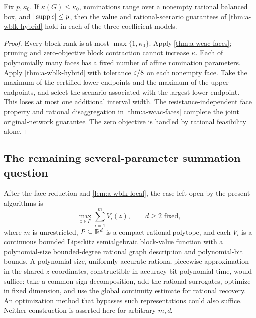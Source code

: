 \begin{corollary}
\label{cor:a-wblk-hybrid-box}
Fix $p,\kappa_0$. If $\kappa(G)\le\kappa_0$, nominations range over a
nonempty rational balanced box, and $|\operatorname{supp} c|\le p$, then the value and
rational-scenario guarantees of \cref{thm:a-wblk-hybrid} hold in each
of the three coefficient models.
\end{corollary}
\begin{proof}
Every block rank is at most $\max\{1,\kappa_0\}$. Apply
\cref{thm:a-wcac-faces}; pruning and zero-objective block contraction
cannot increase $\kappa$. Each of polynomially many faces has a fixed
number of affine nomination parameters. Apply
\cref{thm:a-wblk-hybrid} with tolerance $\varepsilon/8$ on each nonempty face.
Take the maximum of the certified lower endpoints and the maximum of
the upper endpoints, and select the scenario associated with the largest
lower endpoint. This loses at most one additional interval width.
The resistance-independent face property and rational disaggregation
in \cref{thm:a-wcac-faces} complete the joint original-network guarantee.
The zero objective is handled by rational feasibility alone.
\end{proof}

\subsection{The remaining several-parameter summation question}

After the face reduction and \cref{lem:a-wblk-local}, the case left
open by the present algorithms is
\begin{equation}
 \max_{z\in P}\sum_{i=1}^m V_i(z),\qquad d\ge2\text{ fixed},
 \label{eq:a-wblk-residual}
\end{equation}
where $m$ is unrestricted, $P\subseteq\mathbb{R}^d$ is a compact rational
polytope, and each $V_i$ is a continuous bounded Lipschitz semialgebraic
block-value function with a polynomial-size bounded-degree rational graph
description and polynomial-bit bounds. A polynomial-size, uniformly
accurate rational piecewise approximation in the shared $z$ coordinates,
constructible in accuracy-bit polynomial time, would suffice: take a
common sign decomposition, add the rational surrogates, optimize in fixed
dimension, and use the global continuity estimate for rational recovery.
An optimization method that bypasses such representations could also
suffice. Neither construction is asserted here for arbitrary $m,d$.

